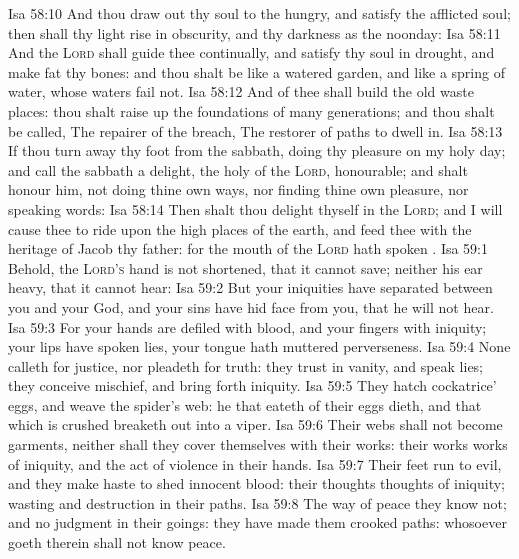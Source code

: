 \vs Isa 58:10 And  thou draw out thy soul to the hungry, and satisfy the afflicted soul; then shall thy light rise in obscurity, and thy darkness  as the noonday:
\vs Isa 58:11 And the \textsc{Lord} shall guide thee continually, and satisfy thy soul in drought, and make fat thy bones: and thou shalt be like a watered garden, and like a spring of water, whose waters fail not.
\vs Isa 58:12 And  of thee shall build the old waste places: thou shalt raise up the foundations of many generations; and thou shalt be called, The repairer of the breach, The restorer of paths to dwell in.
\vs Isa 58:13 If thou turn away thy foot from the sabbath,  doing thy pleasure on my holy day; and call the sabbath a delight, the holy of the \textsc{Lord}, honourable; and shalt honour him, not doing thine own ways, nor finding thine own pleasure, nor speaking  words:
\vs Isa 58:14 Then shalt thou delight thyself in the \textsc{Lord}; and I will cause thee to ride upon the high places of the earth, and feed thee with the heritage of Jacob thy father: for the mouth of the \textsc{Lord} hath spoken .
\vs Isa 59:1 Behold, the \textsc{Lord's} hand is not shortened, that it cannot save; neither his ear heavy, that it cannot hear:
\vs Isa 59:2 But your iniquities have separated between you and your God, and your sins have hid  face from you, that he will not hear.
\vs Isa 59:3 For your hands are defiled with blood, and your fingers with iniquity; your lips have spoken lies, your tongue hath muttered perverseness.
\vs Isa 59:4 None calleth for justice, nor  pleadeth for truth: they trust in vanity, and speak lies; they conceive mischief, and bring forth iniquity.
\vs Isa 59:5 They hatch cockatrice' eggs, and weave the spider's web: he that eateth of their eggs dieth, and that which is crushed breaketh out into a viper.
\vs Isa 59:6 Their webs shall not become garments, neither shall they cover themselves with their works: their works  works of iniquity, and the act of violence  in their hands.
\vs Isa 59:7 Their feet run to evil, and they make haste to shed innocent blood: their thoughts  thoughts of iniquity; wasting and destruction  in their paths.
\vs Isa 59:8 The way of peace they know not; and  no judgment in their goings: they have made them crooked paths: whosoever goeth therein shall not know peace.
